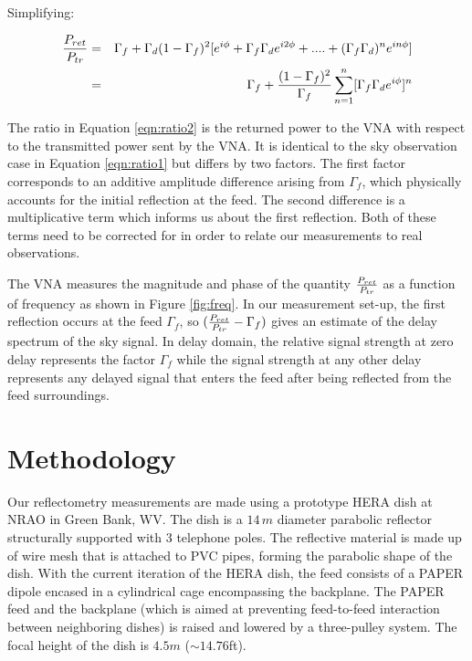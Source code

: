 \documentclass[12pt,preprint]{aastex}
\begin{document}
Simplifying:
 
  \begin{eqnarray}\label{eqn:ratio2}
 {P_{ret} \over P_{tr} } & = & \Gamma_{f}
  +  \Gamma_{d}(1-\Gamma_f)^{2} [e^{i\phi}+ \Gamma_{f}\Gamma_{d} e^{i2\phi}+  ....+ (\Gamma_{f}\Gamma_{d})^{n}e^{i n\phi}]\nonumber\\
  & = & \Gamma_{f} + { (1-\Gamma_f)^{2}\over \Gamma_{f} } \displaystyle\sum\limits_{n=1}^{n} [\Gamma_{f}\Gamma_{d}e^{i\phi}]^{n}
   \nonumber\\
\end{eqnarray}

The ratio in Equation \ref{eqn:ratio2} is the returned power to the VNA with
respect to the transmitted power sent by the VNA. It is identical to the sky
observation case in Equation \ref{eqn:ratio1} but differs by two factors. The
first factor corresponds to an additive amplitude difference arising from
$\Gamma_{f}$, which physically accounts for the initial reflection at the feed.
The second difference is a multiplicative term which informs us about the first
reflection. Both of these terms need to be corrected for in order to relate our
measurements to real observations.

The VNA measures the magnitude and phase of the quantity ${P_{ret}\over P_{tr}}$
as a function of frequency as shown in Figure \ref{fig:freq}. In our measurement
set-up, the first reflection occurs at the feed $\Gamma_{f}$, so
$({P_{ret} \over P_{tr} }  - \Gamma_{f}) $ gives an estimate of the delay
spectrum of the sky signal. In delay domain, the relative signal strength at
zero delay represents the factor $\Gamma_{f}$ while the signal strength at any
other delay represents any delayed signal that enters the feed after being
reflected from the feed surroundings. 

\section{Methodology}{\label{sec:methods}}

Our reflectometry measurements are made using a prototype HERA dish at NRAO in Green Bank, WV. The dish is a $14\,m$ diameter
parabolic reflector structurally supported with 3 telephone poles. The
reflective material is made up of wire mesh that is attached to PVC
pipes, forming the parabolic shape of the dish. With the current iteration of
the HERA dish, the feed consists of a PAPER dipole encased in a cylindrical cage
encompassing the backplane. The PAPER feed and the backplane (which is aimed at
preventing feed-to-feed interaction between neighboring dishes) is raised and
lowered by a three-pulley system. The focal height of the dish is $4.5m$
($\sim{14.76}$ft).  
\end{document}
